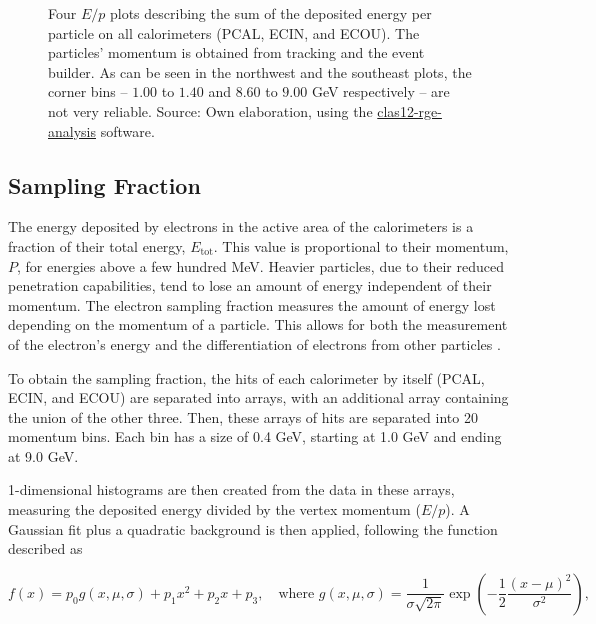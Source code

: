     \begin{figure}[b!]
        \centering{}
        \caption[Calorimeters $E/p$ plots]{Four $E/p$ plots describing the sum of the deposited energy per particle on all calorimeters (PCAL, ECIN, and ECOU).
        The particles' momentum is obtained from tracking and the event builder.
        As can be seen in the northwest and the southeast plots, the corner bins -- $1.00$ to $1.40$ and $8.60$ to $9.00$ GeV respectively -- are not very reliable.
        Source: Own elaboration, using the \hyperlink{github.com/bleaktwig/clas12-rge-analysis}{clas12-rge-analysis} software.}
        \label{fig::13.30::sampling_fraction_fit_1d}
    \end{figure}

\subsection{Sampling Fraction}
\label{13.30::sampling_fraction}
    The energy deposited by electrons in the active area of the calorimeters is a fraction of their total energy, $E_\text{tot}$.
    This value is proportional to their momentum, $P$, for energies above a few hundred MeV.
    Heavier particles, due to their reduced penetration capabilities, tend to lose an amount of energy independent of their momentum.
    The electron sampling fraction measures the amount of energy lost depending on the momentum of a particle.
    This allows for both the measurement of the electron's energy and the differentiation of electrons from other particles \cite{wigmans2000}.

    To obtain the sampling fraction, the hits of each calorimeter by itself (PCAL, ECIN, and ECOU) are separated into arrays, with an additional array containing the union of the other three.
    Then, these arrays of hits are separated into 20 momentum bins.
    Each bin has a size of 0.4 GeV, starting at 1.0 GeV and ending at 9.0 GeV.

    1-dimensional histograms are then created from the data in these arrays, measuring the deposited energy divided by the vertex momentum ($E/p$).
    A Gaussian fit plus a quadratic background is then applied, following the function described as

    \begin{equation*}
        f(x) = p_0 g(x, \mu, \sigma) + p_1 x^2 + p_2 x + p_3, \hspace{12pt}
        \text{where} \hspace{4pt}
        g(x, \mu, \sigma) = \frac{1}{\sigma \sqrt{2\pi}} \exp \left(-\frac{1}{2} \frac{(x - \mu)^2}{\sigma^2}\right),
    \end{equation*}


